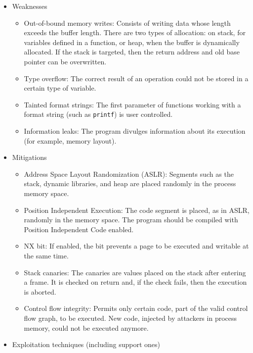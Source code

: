 \documentclass[../main.tex]{subfiles}
\begin{document}
\begin{itemize}
      \tightlist
      \item
            Weaknesses

            \begin{itemize}
                  \tightlist
                  \item
                        Out-of-bound memory writes: Consists of writing data whose length
                        exceeds the buffer length. There are two types of allocation: on
                        stack, for variables defined in a function, or heap, when the buffer
                        is dynamically allocated. If the stack is targeted, then the return
                        address and old base pointer can be overwritten.
                  \item
                        Type overflow: The correct result of an operation could not be
                        stored in a certain type of variable.
                  \item
                        Tainted format strings: The first parameter of functions working
                        with a format string (such as \texttt{printf}) is user controlled.
                  \item
                        Information leaks: The program divulges information about its
                        execution (for example, memory layout).
            \end{itemize}
      \item
            Mitigations

            \begin{itemize}
                  \tightlist
                  \item
                        Address Space Layout Randomization (ASLR): Segments such
                        as the stack, dynamic libraries, and heap are placed randomly in the
                        process memory space.
                  \item
                        Position Independent Execution: The code segment is placed, as in
                        ASLR, randomly in the memory space. The program should be compiled
                        with Position Independent Code enabled.
                  \item
                        NX bit: If enabled, the bit prevents a page to be executed and
                        writable at the same time.
                  \item
                        Stack canaries: The canaries are values placed on the stack after
                        entering a frame. It is checked on return and, if the check fails,
                        then the execution is aborted.
                  \item
                        Control flow integrity: Permits only certain code, part of the valid
                        control flow graph, to be executed. New code, injected by attackers
                        in process memory, could not be executed anymore.
            \end{itemize}
      \item
            Exploitation techniques (including support ones)


\end{itemize}
\end{document}
